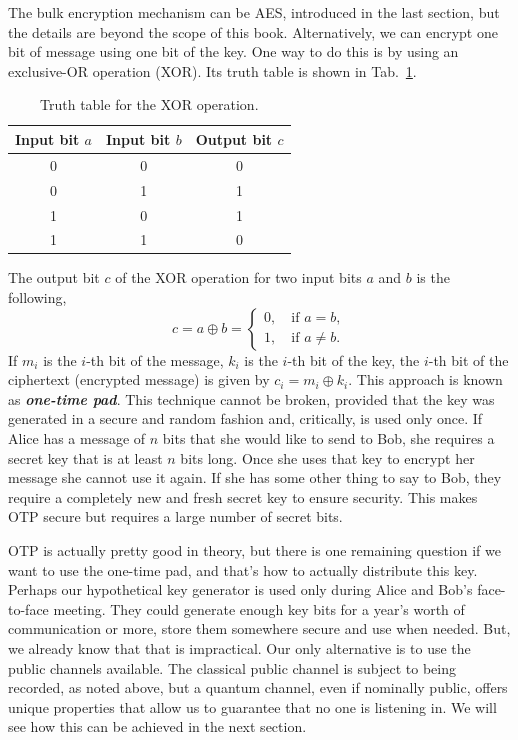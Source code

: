 The bulk encryption mechanism can be AES, introduced in the last section, but the details are beyond the scope of this book.
Alternatively, we can encrypt one bit of message using one bit of the key. 
One way to do this is by using an exclusive-OR operation (XOR).
Its truth table is shown in Tab.~\ref{tab:xor_truth_table}.
\begin{table}[t]
    \setcellgapes{5pt}
    \renewcommand\theadfont{}
    \makegapedcells
    \centering
    \begin{tabular}{ccc}
        \hline
        \textbf{Input bit $a$} & \textbf{Input bit $b$} & \textbf{Output bit $c$} \\
        \hline
        0 & 0 & 0 \\
        0 & 1 & 1 \\
        1 & 0 & 1 \\
        1 & 1 & 0 \\
        \hline
    \end{tabular}
    \caption[XOR operation.]{Truth table for the XOR operation.}
    \label{tab:xor_truth_table}
\end{table}
The output bit $c$ of the XOR operation for two input bits $a$ and $b$ is the following,
\begin{equation}
    c = a \oplus b = \begin{cases}
        0, \quad \text{if } a = b, \\
        1, \quad \text{if } a \neq b.
    \end{cases}
\end{equation}
If $m_i$ is the $i$-th bit of the message, $k_i$ is the $i$-th bit of the key, the $i$-th bit of the ciphertext (encrypted message) is given by $c_i = m_i \oplus k_i$. 
This approach is known as \textbf{\emph{one-time pad}}.
This technique cannot be broken, provided that the key was generated in a secure and random fashion and, critically, is used only once.
If Alice has a message of $n$ bits that she would like to send to Bob, she requires a secret key that is at least $n$ bits long.
Once she uses that key to encrypt her message she cannot use it again. If she has some other thing to say to Bob, they require a completely new and fresh secret key to ensure security.
This makes OTP secure but requires a large number of secret bits.

OTP is actually pretty good in theory, but there is one remaining question if we want to use the one-time pad, and that's how to actually distribute this key.
Perhaps our hypothetical key generator is used only during Alice and Bob's face-to-face meeting.
They could generate enough key bits for a year's worth of communication or more, store them somewhere secure and use when needed.
But, we already know that that is impractical.
Our only alternative is to use the public channels available.
The classical public channel is subject to being recorded, as noted above, but a quantum channel, even if nominally public, offers unique properties that allow us to guarantee that no one is listening in.
We will see how this can be achieved in the next section.




